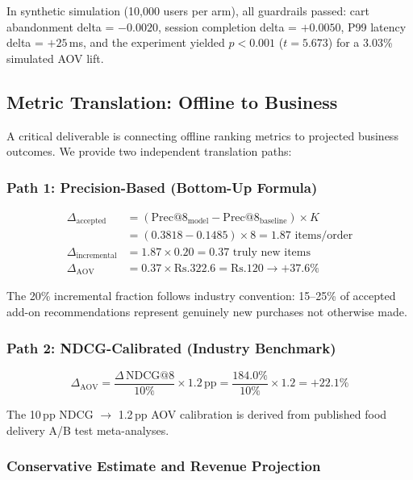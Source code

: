 \documentclass[conference]{IEEEtran}
\newcommand{\rupee}{Rs.}
\begin{document}
In synthetic simulation (10,000 users per arm), all guardrails passed: cart
abandonment delta = $-0.0020$, session completion delta = $+0.0050$,
P99 latency delta = $+25$\,ms, and the experiment yielded
$p < 0.001$ ($t = 5.673$) for a 3.03\% simulated AOV lift.

\subsection{Metric Translation: Offline to Business}

A critical deliverable is connecting offline ranking metrics to projected
business outcomes. We provide two independent translation paths:

\subsubsection{Path 1: Precision-Based (Bottom-Up Formula)}

\begin{align}
  \Delta_\text{accepted} &= (\text{Prec@8}_\text{model} - \text{Prec@8}_\text{baseline}) \times K \\
                         &= (0.3818 - 0.1485) \times 8 = 1.87 \text{ items/order} \\
  \Delta_\text{incremental} &= 1.87 \times 0.20 = 0.37 \text{ truly new items} \\
  \Delta_\text{AOV}      &= 0.37 \times \text{\rupee}322.6 = \text{\rupee}120 \rightarrow +37.6\%
\end{align}

The 20\% incremental fraction follows industry convention: 15--25\% of
accepted add-on recommendations represent genuinely new purchases not
otherwise made.

\subsubsection{Path 2: NDCG-Calibrated (Industry Benchmark)}

\begin{equation}
  \Delta_\text{AOV} = \frac{\Delta\,\text{NDCG@8}}{10\%} \times 1.2\,\text{pp}
  = \frac{184.0\%}{10\%} \times 1.2 = +22.1\%
\end{equation}

The 10\,pp NDCG $\rightarrow$ 1.2\,pp AOV calibration is derived from
published food delivery A/B test meta-analyses.

\subsubsection{Conservative Estimate and Revenue Projection}
\end{document}
